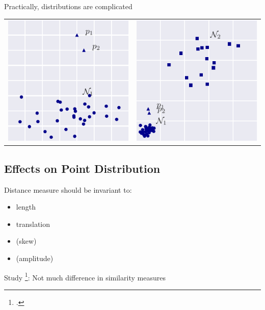 \documentclass{beamer}
\begin{document}
  \begin{frame}{Practically, distributions are complicated}
    
    \centering
    \begin{tabular}{c|c}
    \includegraphics[width=.45\textwidth]{figs/hard1_dist.pdf} &
    \includegraphics[width=.45\textwidth]{figs/hard2_dist.pdf}
    \end{tabular}

  \end{frame}


  \subsection{Effects on Point Distribution}


  \begin{frame}{Distance measure should be invariant to:}

    \begin{itemize}
      \item length
      \item translation
      \item (skew)
      \item (amplitude)
    \end{itemize}

    Study \footcite{Wang2013}: Not much difference in similarity measures

  \end{frame}
\end{document}
